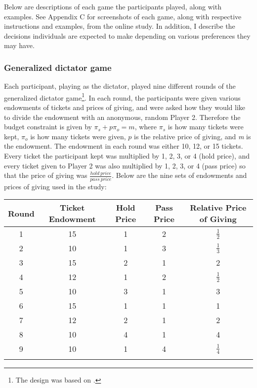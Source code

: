 \documentclass[12pt]{article}
\begin{document}
Below are descriptions of each game the participants played, along with examples. See Appendix C for screenshots of each game, along with respective instructions and examples, from the online study. In addition, I describe the decisions individuals are expected to make depending on various preferences they may have.

\subsubsection{Generalized dictator game}

Each participant, playing as the dictator, played nine different rounds of the generalized dictator game\footnote{The design was based on \cite{andreoni_miller_2002}.}. In each round, the participants were given various endowments of tickets and prices of giving, and were asked how they would like to divide the endowment with an anonymous, random Player 2. Therefore the budget constraint is given by \(\pi_{s} + p\pi_{o} = \textit{m}\), where \(\pi_{s}\) is how many tickets were kept, \(\pi_{o}\) is how many tickets were given, \(p\) is the relative price of giving, and \textit{m} is the endowment. The endowment in each round was either 10, 12, or 15 tickets. Every ticket the participant kept was multiplied by 1, 2, 3, or 4 (hold price), and every ticket given to Player 2 was also multiplied by 1, 2, 3, or 4 (pass price) so that the price of giving was \(\frac{hold \ price}{pass \ price}\). Below are the nine sets of endowments and prices of giving used in the study:

\begin{center}
\begin{tabular}{ c c c c c }
\hline \hline
 Round & Ticket Endowment & Hold Price & Pass Price & Relative Price of Giving \\ 
 \hline
1 & 15 & 1 & 2 & \(\frac{1}{2}\)  \\  
2 & 10 & 1 & 3 & \(\frac{1}{3}\)  \\  
3 & 15 & 2 & 1 & 2 \\  
4 & 12 & 1 & 2 & \(\frac{1}{2}\)  \\  
5 & 10 & 3 & 1 & 3  \\  
6 & 15 & 1 & 1 & 1  \\  
7 & 12 & 2 & 1 & 2 \\  
8 & 10 & 4 & 1 & 4 \\  
9 & 10 & 1 & 4 & \(\frac{1}{4}\)  \\ 
\hline \hline \\
\end{tabular}
\end{center}
\end{document}
